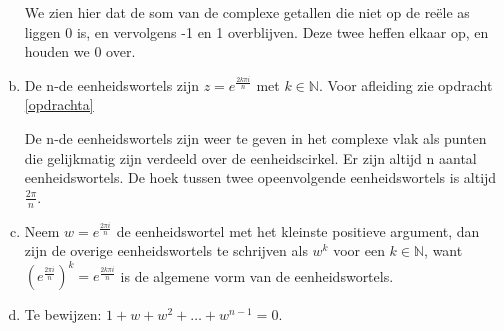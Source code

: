 \documentclass[12pt, a4paper]{article}
\begin{document}
\begin{enumerate}[(a).]
\begin{center}
    \end{center}
    \begin{center}
        \footnotesize We zien hier dat de som van de complexe getallen die niet op de reële as liggen 0 is, en vervolgens -1 en 1 overblijven. Deze twee heffen elkaar op, en houden we 0 over.
    \end{center}
    \bigskip
    \item 
    De n-de eenheidswortels zijn $z = e^{\frac{2k\pi i}{n}}$ met $k \in \mathbb{N}$. Voor afleiding zie opdracht \ref{opdrachta}

    De n-de eenheidswortels zijn weer te geven in het complexe vlak als punten die gelijkmatig zijn verdeeld over de eenheidscirkel. Er zijn altijd n aantal eenheidswortels. De hoek tussen twee opeenvolgende eenheidswortels is altijd $\frac{2\pi}{n}$.

    \item 
    Neem $w = e^{\frac{2\pi i}{n}}$ de eenheidswortel met het kleinste positieve argument, dan zijn de overige eenheidswortels te schrijven als $w^k$ voor een $k \in \mathbb{N}$, want ${(e^{\frac{2\pi i}{n}})}^k = e^{\frac{2k\pi i}{n}}$ is de algemene vorm van de eenheidswortels.
    \newpage
    \item \label{opdrachtd}
    Te bewijzen: $1 + w + w^2 + \dots + w^{n - 1} = 0$.


\end{enumerate}
\end{document}
